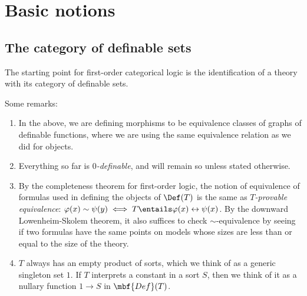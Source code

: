 \section{Basic notions}
\subsection{The category of definable sets}
The starting point for first-order categorical logic is the identification of a theory with its category of definable sets.


Some remarks:
\begin{enumerate}
\item In the above, we are defining morphisms to be equivalence classes of graphs of definable functions, where we are using the same equivalence relation as we did for objects.

\item Everything so far is \emph{\(0\)-definable}, and will remain so unless stated otherwise.

\item By the completeness theorem for first-order logic, the notion of equivalence of formulas used in defining the objects of $\Def(T)$ is the same as \emph{$T$-provable equivalence}: $\varphi(x) \sim \psi(y) \iff T \entails \varphi(x) \leftrightarrow \psi(x)$. By the downward Lowenheim-Skolem theorem, it also suffices to check $\sim$-equivalence by seeing if two formulas have the same points on models whose sizes are less than or equal to the size of the theory.

\item $T$ always has an empty product of sorts, which we think of as a generic singleton set $1$. If \(T\) interprets a constant in a sort $S$, then we think of it as a nullary function $1 \to S$ in \(\mbf{Def}(T)\).
\end{enumerate}

